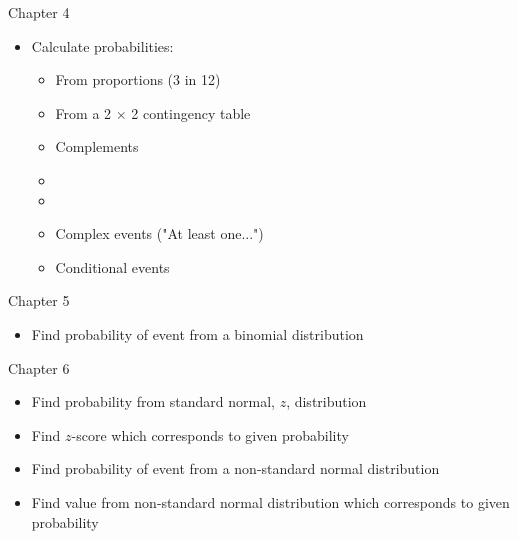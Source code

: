 \documentclass[xcolor=table]{beamer}
\begin{document}
\begin{frame}{Chapter 4}
\begin{block}{}
\begin{itemize}
\item Calculate probabilities:
\begin{itemize}
\item From proportions (3 in 12)
\item From a 2 $\times$ 2 contingency table
\item Complements
\item {}
\item {}
\item Complex events ("At least one...")
\item Conditional events
\end{itemize}
\end{itemize}
\end{block}
\end{frame}

\begin{frame}{Chapter 5}
\begin{block}{}
\begin{itemize}
\item Find probability of event from a binomial distribution
\end{itemize}
\end{block}
\end{frame}

\begin{frame}{Chapter 6}
\begin{block}{}
\begin{itemize}
\item Find probability from standard normal, $z$, distribution
\item Find $z$-score which corresponds to given probability
\item Find probability of event from a non-standard normal distribution
\item Find value from non-standard normal distribution which corresponds to given probability
\end{itemize}
\end{block}
\end{frame}
\end{document}
